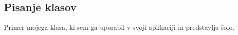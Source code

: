 {\color{indiagreen}\subsection{Pisanje klasov}}
Primer mojega klasa, ki sem ga uporabil v svoji aplikaciji in predstavlja šolo.
